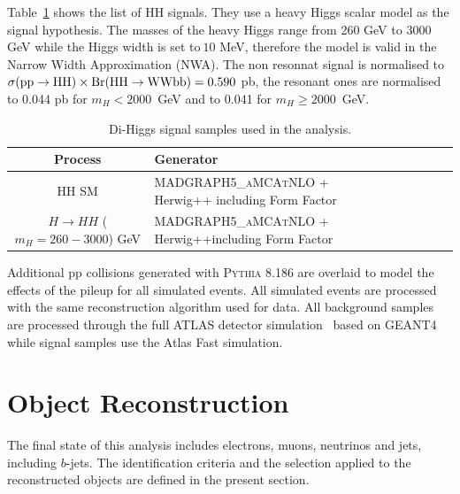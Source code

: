 Table~\ref{tabular:mc_samples_hh} shows the list of HH signals. 
They use a heavy Higgs scalar model as the signal hypothesis. The 
masses of the heavy Higgs range from 260 GeV to 3000 GeV while
the Higgs width is set to$~10$ MeV, therefore the model is valid in
the Narrow Width Approximation (NWA).
The non resonnat signal is normalised to $\sigma {\rm (pp} \to {\rm  HH)} \times
{\rm Br(HH}\to{\rm  WWbb)} = 0.590$ pb, the resonant ones are
normalised to 0.044 pb for $m_H < 2000$~GeV and to 0.041 for $m_H \ge
2000$~GeV.




\begin{table}[!htb]
\begin{center}
\scriptsize
\begin{tabular}{|c|l|c|c|c|c|r|}
	\hline
 Process                                    & Generator    \\ \hline
HH SM & \textsc{MADGRAPH5\_aMCAtNLO} + Herwig++ including Form Factor \\
$H \to HH$ ($m_H =260 - 3000$) GeV & \textsc{MADGRAPH5\_aMCAtNLO} +
                                     Herwig++including Form Factor \\
\hline
\end{tabular}
\caption{Di-Higgs signal samples used in the analysis. }
\label{tabular:mc_samples_hh}
\end{center}
\end{table}


Additional pp collisions generated with \textsc{Pythia} 8.186 are
overlaid to model the effects of the pileup for all simulated
events. All simulated events are processed with the same
reconstruction algorithm used for data. All background samples are processed
through the full ATLAS detector simulation~\cite{Aad:2010ah} based 
on \textsc{GEANT4}~\cite{Agostinelli:2002hh} while signal samples use
the Atlas Fast simulation.

\section{Object Reconstruction}
The final state of this analysis includes electrons, muons, neutrinos and jets, including $b$-jets. 
The identification criteria and the selection applied to the reconstructed objects are defined in the
present section.

